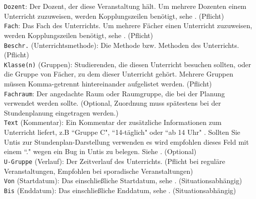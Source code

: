 \noindent
\texttt{Dozent}:  Der Dozent, der diese Veranstaltung hält. Um mehrere Dozenten einem Unterricht zuzuweisen, werden Kopplungszeilen benötigt, sehe . (Pflicht)\\

\noindent
\texttt{Fach}:  Das Fach des Unterrichts. Um mehrere Fächer einen Unterricht zuzuweisen, werden Kopplungszeilen benötigt, sehe . (Pflicht)\\

\noindent
\texttt{Beschr.} (Unterrichtsmethode):  Die Methode bzw. Methoden des Unterrichts. (Pflicht)\\

\noindent
\texttt{Klasse(n)} (Gruppen):  Studierenden, die diesen Unterricht besuchen sollten, oder die Gruppe von Fächer, zu dem dieser Unterricht gehört. Mehrere Gruppen müssen Komma-getrennt hintereinander aufgelistet werden. (Pflicht)\\

\noindent
\texttt{Fachraum}:  Der angedachte Raum oder Raumgruppe, die bei der Planung verwendet werden sollte. (Optional, Zuordnung muss spätestens bei der Stundenplanung eingetragen werden.)\\

\noindent
\texttt{Text} (Kommentar):  Ein Kommentar der zusätzliche Informationen zum Unterricht liefert, z.B ``Gruppe C", \hspace{1pt} ``14-täglich" \hspace{1pt} oder ``ab 14 Uhr" \hspace{1pt}. Sollten Sie Untis zur Stundenplan-Darstellung verwenden es wird empfohlen dieses Feld mit einem ``." \hspace{1pt} wegen ein Bug in Untis zu belegen. Siehe . (Optional)\\

\noindent
\texttt{U-Gruppe} (Verlauf):  Der Zeitverlauf des Unterrichts. (Pflicht bei reguläre Veranstaltungen, Empfohlen bei sporadische Veranstaltungen)\\

\noindent
\texttt{Von} (Startdatum):  Das einschließliche Startdatum, sehe . (Situationsabhängig)\\

\noindent
\texttt{Bis} (Enddatum):  Das einschließliche Enddatum, sehe . (Situationsabhängig)\\

